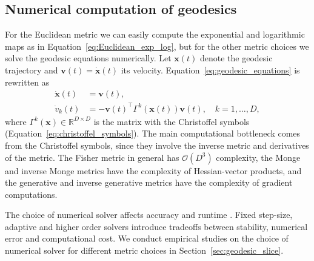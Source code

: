 \subsection{Numerical computation of geodesics}
For the Euclidean metric we can easily compute the exponential and logarithmic maps as in Equation~\ref{eq:Euclidean_exp_log}, but for the other metric choices we solve the geodesic equations numerically. Let $\boldsymbol{x}(t)$ denote the geodesic trajectory and $\boldsymbol{v}(t)=\boldsymbol{\dot x}(t)$ its velocity. Equation~\ref{eq:geodesic_equations} is rewritten as
\begin{align}
      \boldsymbol{ \dot x}(t)  &= \boldsymbol{v}(t), \nonumber \\
    \dot v_k(t) &= - \boldsymbol{v}(t)^\top\Gamma^k(\boldsymbol{x}(t))  \boldsymbol{v}(t), \quad  k = 1, \ldots, D, \label{eq:geoeqs}
\end{align}
where $\Gamma^k(\boldsymbol{x})\in\mathbb{R}^{D\times D}$ is the matrix with the Christoffel symbols (Equation~\ref{eq:christoffel_symbols}). 
The main computational bottleneck comes from the Christoffel symbols, since they involve the inverse metric and derivatives of the metric. The Fisher metric in general has $\mathcal{O}(D^3)$ complexity, the Monge and inverse Monge metrics have the complexity of Hessian-vector products, and the generative and inverse generative metrics have the complexity of gradient computations.

The choice of numerical solver affects accuracy and runtime \citep{kidger2022neural}. Fixed step-size, adaptive and higher order solvers introduce tradeoffs between stability, numerical error and computational cost. We conduct empirical studies on the choice of numerical solver for different metric choices in Section~\ref{sec:geodesic_slice}.



